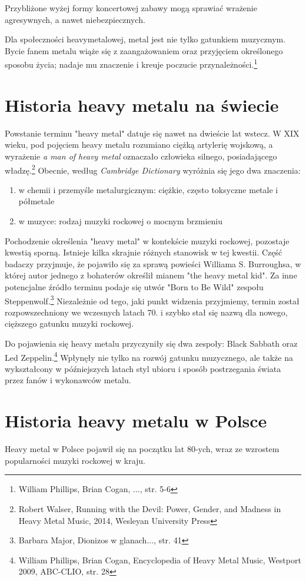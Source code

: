 \documentclass[12pt, a4paper, titlepage]{report}
\begin{document}
Przybliżone wyżej formy koncertowej zabawy mogą sprawiać wrażenie agresywnych, a nawet niebezpiecznych. 

Dla społeczności heavymetalowej, metal jest nie tylko gatunkiem muzycznym. Bycie fanem metalu wiąże się z zaangażowaniem oraz przyjęciem określonego sposobu życia; nadaje mu znaczenie i kreuje poczucie przynależności.\footnote{William Phillips, Brian Cogan, ..., str. 5-6}

\section{Historia heavy metalu na świecie}
Powstanie terminu "heavy metal" datuje się nawet na dwieście lat wstecz. W XIX wieku, pod pojęciem heavy metalu rozumiano ciężką artylerię wojskową, a wyrażenie \textit{a man of heavy metal} oznaczało człowieka silnego, posiadającego władzę.\footnote{Robert Walser, Running with the Devil: Power, Gender, and Madness in Heavy Metal Music, 2014, Wesleyan University Press}  Obecnie, według \textit{Cambridge Dictionary} wyróżnia się jego dwa znaczenia: 
\begin{enumerate}
\item w chemii i przemyśle metalurgicznym: ciężkie, często toksyczne metale  i półmetale
\item w muzyce: rodzaj muzyki rockowej o mocnym brzmieniu
\end{enumerate}
Pochodzenie określenia "heavy metal" w kontekście muzyki rockowej, pozostaje kwestią sporną. Istnieje kilka skrajnie różnych stanowisk w tej kwestii. Część badaczy przyjmuje, że pojawiło się za sprawą powieści Williama S. Burroughsa, w której autor jednego z bohaterów określił mianem "the heavy metal kid". Za inne potencjalne źródło terminu podaje się utwór "Born to Be Wild" zespołu Steppenwolf.\footnote{Barbara Major, Dionizos w glanach..., str. 41} Niezależnie od tego, jaki punkt widzenia przyjmiemy, termin został rozpowszechniony we wczesnych latach 70. i szybko stał się nazwą dla nowego, cięższego gatunku muzyki rockowej. 
 
Do pojawienia się heavy metalu przyczyniły się dwa zespoły: Black Sabbath oraz Led Zeppelin.\footnote{William Phillips, Brian Cogan, Encyclopedia of Heavy Metal Music, Westport 2009, ABC-CLIO, str. 28} Wpłynęły nie tylko na rozwój gatunku muzycznego, ale także na wykształcony w późniejszych latach styl ubioru i sposób postrzegania świata przez fanów i wykonawców metalu. 

\section{Historia heavy metalu w Polsce}
Heavy metal w Polsce pojawił się na początku lat 80-ych, wraz ze wzrostem popularności muzyki rockowej w kraju. %
\end{document}
